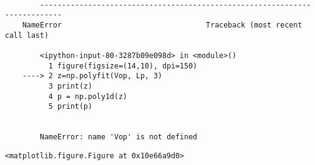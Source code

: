 \documentclass{article}
\begin{document}
    \begin{Verbatim}[commandchars=\\\{\}]

        ---------------------------------------------------------------------------
    NameError                                 Traceback (most recent call last)

        <ipython-input-80-3287b09e098d> in <module>()
          1 figure(figsize=(14,10), dpi=150)
    ----> 2 z=np.polyfit(Vop, Lp, 3)
          3 print(z)
          4 p = np.poly1d(z)
          5 print(p)


        NameError: name 'Vop' is not defined

    \end{Verbatim}

    
    \begin{verbatim}
<matplotlib.figure.Figure at 0x10e66a9d0>
    \end{verbatim}
\end{document}
